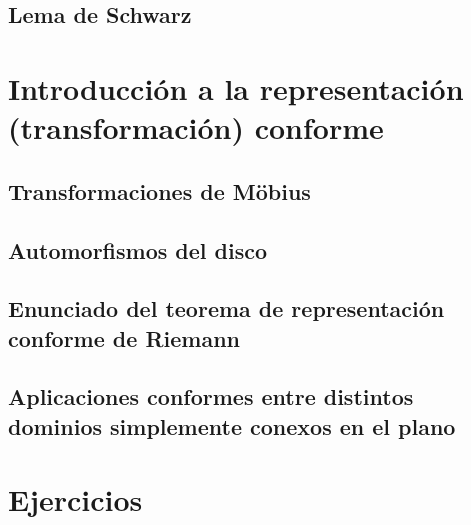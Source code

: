 \documentclass{apuntes}
\begin{document}
\section{Lema de Schwarz}


\chapter{Introducción a la representación (transformación) conforme}
\section{Transformaciones de Möbius}
\section{Automorfismos del disco}
\section{Enunciado del teorema de representación conforme de Riemann}
\section{Aplicaciones conformes entre distintos dominios simplemente conexos en el plano}


\appendix

\chapter{Ejercicios}

\printindex
\end{document}
